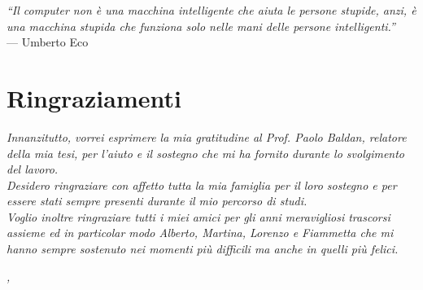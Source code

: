 
\cleardoublepage
{}
{}

\begin{flushright}{
	\slshape    
	``Il computer non è una macchina intelligente che aiuta le persone stupide, anzi, è una macchina stupida che funziona solo nelle mani delle persone intelligenti.''} \\ 
	\medskip
    --- Umberto Eco
\end{flushright}


\bigskip

\begingroup
\let\clearpage\relax
\let\cleardoublepage\relax
\let\cleardoublepage\relax

\chapter*{Ringraziamenti}

\noindent \textit{Innanzitutto, vorrei esprimere la mia gratitudine al Prof. Paolo Baldan, relatore della mia tesi, per l'aiuto e il sostegno che mi ha fornito durante lo svolgimento del lavoro.}\\

\noindent \textit{Desidero ringraziare con affetto tutta la mia famiglia per il loro sostegno e per essere stati sempre presenti durante il mio percorso di studi.}\\

\noindent \textit{Voglio inoltre ringraziare tutti i miei amici per gli anni meravigliosi trascorsi assieme ed in particolar modo Alberto, Martina, Lorenzo e Fiammetta che mi hanno sempre sostenuto nei momenti più difficili ma anche in quelli più felici.}\\
\bigskip

\noindent\textit{\myLocation, \myTime}
\hfill \myName

\endgroup

